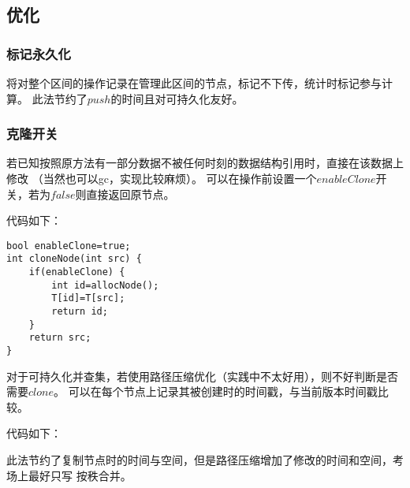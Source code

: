 \subsection{优化}
\subsubsection{标记永久化}
将对整个区间的操作记录在管理此区间的节点，标记不下传，统计时标记参与计算。
此法节约了$push$的时间且对可持久化友好。
\subsubsection{克隆开关}
若已知按照原方法有一部分数据不被任何时刻的数据结构引用时，直接在该数据上修改
（当然也可以gc，实现比较麻烦）。
可以在操作前设置一个$enableClone$开关，若为$false$则直接返回原节点。

代码如下：
\begin{lstlisting}[title=cloneA]
bool enableClone=true;
int cloneNode(int src) {
    if(enableClone) {
        int id=allocNode();
        T[id]=T[src];
        return id;
    }
    return src;
}
\end{lstlisting}

对于可持久化并查集，若使用路径压缩优化（实践中不太好用），则不好判断是否需要$clone$。
可以在每个节点上记录其被创建时的时间戳，与当前版本时间戳比较。

代码如下：

此法节约了复制节点时的时间与空间，但是路径压缩增加了修改的时间和空间，考场上最好只写
按秩合并。
